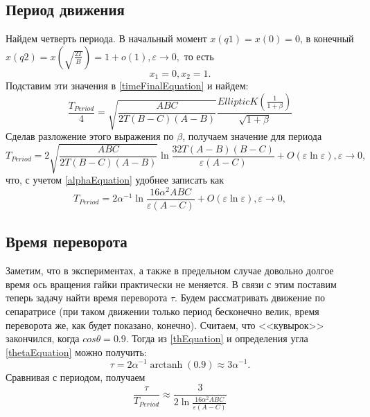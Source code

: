\documentclass{article}
\DeclareMathOperator\arctanh{arctanh}
\begin{document}
\subsection{Период движения}
Найдем четверть периода. В начальный момент \begin{math} x(q1)=x(0)=0 \end{math}, в конечный \begin{math} x(q2)=x(\sqrt{\frac{2T}{B}})=1+o(1),\varepsilon\rightarrow 0, \end{math} то есть
\begin{equation}
x_1=0, x_2=1.
\end{equation}
Подставим эти значения в \ref{timeFinalEquation} и найдем:
\begin{equation}
\frac{T_{Period}}{4}=\sqrt{\frac{ABC}{2T(B-C)(A-B)}}\frac{EllipticK(\frac{1}{1 + \beta})}{\sqrt{1 + \beta}}
\end{equation}
Сделав разложение этого выражения по \begin{math} \beta \end{math}, получаем значение для периода
\begin{equation}
T_{Period}=2\sqrt{\frac{ABC}{2T(B-C)(A-B)}}\ln{\frac{32T(A-B)(B-C)}{\varepsilon(A-C)}}+O(\varepsilon\ln\varepsilon),\varepsilon\rightarrow 0,
\end{equation}
что, с учетом \ref{alphaEquation} удобнее записать как
\begin{equation}
T_{Period}=2\alpha^{-1}\ln{\frac{16\alpha^2ABC}{\varepsilon(A-C)}}+O(\varepsilon\ln\varepsilon),\varepsilon\rightarrow 0,
\end{equation}

\subsection{Время переворота}
Заметим, что в экспериментах, а также в предельном случае довольно долгое время ось вращения гайки практически не меняется. В связи с этим поставим теперь задачу найти время переворота \begin{math} \tau \end{math}. Будем рассматривать движение по сепаратрисе (при таком движении только период бесконечно велик, время переворота же, как будет показано, конечно). Считаем, что <<кувырок>> закончился, когда \begin{math} cos\theta=0.9 \end{math}. Тогда из \ref{thEquation} и определения угла \ref{thetaEquation} можно получить:
\begin{equation}
\tau=2\alpha^{-1}\arctanh(0.9)\approx 3\alpha^{-1}.
\end{equation}
Сравнивая с периодом, получаем
\begin{equation}
\frac{\tau}{T_{Period}}\approx\frac{3}{2\ln{\frac{16\alpha^2ABC}{\varepsilon(A-C)}}}
\end{equation}
\end{document}
